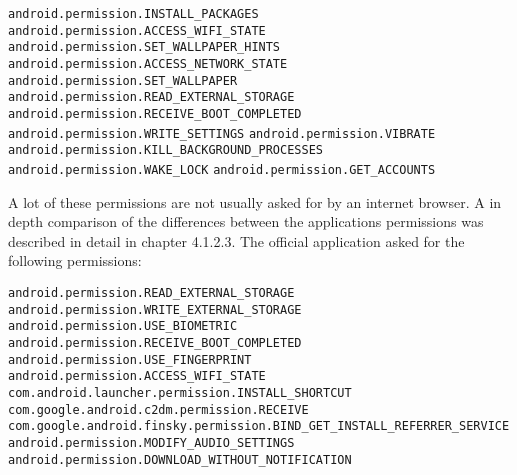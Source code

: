 \newline \texttt{android.permission.INSTALL\_PACKAGES}
\newline \texttt{android.permission.ACCESS\_WIFI\_STATE}
\newline \texttt{android.permission.SET\_WALLPAPER\_HINTS}
\newline \texttt{android.permission.ACCESS\_NETWORK\_STATE}
\newline \texttt{android.permission.SET\_WALLPAPER}
\newline \texttt{android.permission.READ\_EXTERNAL\_STORAGE}
\newline \texttt{android.permission.RECEIVE\_BOOT\_COMPLETED}
\newline \texttt{android.permission.WRITE\_SETTINGS}
\newline \texttt{android.permission.VIBRATE}
\newline \texttt{android.permission.KILL\_BACKGROUND\_PROCESSES}
\newline \texttt{android.permission.WAKE\_LOCK}
\newline \texttt{android.permission.GET\_ACCOUNTS}

A lot of these permissions are not usually asked for by an internet browser. A in depth comparison of the differences between the applications permissions was described in detail in chapter 4.1.2.3.
\newpage
{}
The official application asked for the following permissions:

\texttt{android.permission.READ\_EXTERNAL\_STORAGE }
\newline \texttt{android.permission.WRITE\_EXTERNAL\_STORAGE }
\newline \texttt{android.permission.USE\_BIOMETRIC }
\newline \texttt{android.permission.RECEIVE\_BOOT\_COMPLETED}
\newline \texttt{android.permission.USE\_FINGERPRINT }
\newline \texttt{android.permission.ACCESS\_WIFI\_STATE}
\newline \texttt{com.android.launcher.permission.INSTALL\_SHORTCUT }
\newline \texttt{com.google.android.c2dm.permission.RECEIVE}
\newline \texttt{com.google.android.finsky.permission.BIND\_GET\_INSTALL\_REFERRER\_SERVICE}
\newline \texttt{android.permission.MODIFY\_AUDIO\_SETTINGS }
\newline \texttt{android.permission.DOWNLOAD\_WITHOUT\_NOTIFICATION}

